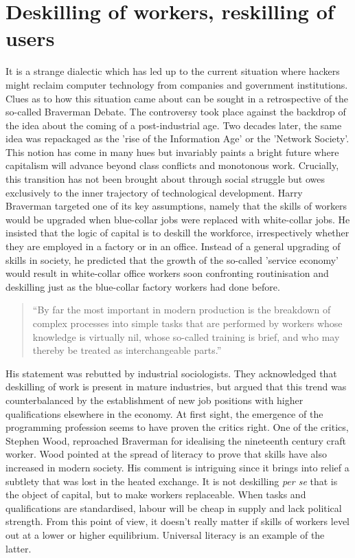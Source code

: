 \section{Deskilling of workers, reskilling of users}
\label{s:hackers_gnunited-deskilling}

It is a strange dialectic which has led up to the current situation where
hackers might reclaim computer technology from companies and government
institutions. Clues as to how this situation came about can be sought in a
retrospective of the so-called Braverman Debate. The controversy took place
against the backdrop of the idea about the coming of a post-industrial
age\cite{gnunited-bell73}. Two decades later, the same idea was repackaged as
the 'rise of the Information Age' or the 'Network Society'. This notion has come
in many hues but invariably paints a bright future where capitalism will advance
beyond class conf\hbox{}licts and monotonous work. Crucially, this transition has not
been brought about through social struggle but owes exclusively to the inner
trajectory of technological development. Harry Braverman targeted one of its key
assumptions, namely that the skills of workers would be upgraded when
blue-collar jobs were replaced with white-collar jobs. He insisted that the
logic of capital is to deskill the workforce, irrespectively whether they are
employed in a factory or in an of\hbox{}f\hbox{}ice. Instead of a general upgrading of
skills in society, he predicted that the growth of the so-called 'service
economy' would result in white-collar of\hbox{}f\hbox{}ice workers soon confronting
routinisation and deskilling just as the blue-collar factory workers had done
before.

\begin{quote}
``By far the most important in modern production is the breakdown of complex
processes into simple tasks that are performed by workers whose knowledge is
virtually nil, whose so-called training is brief, and who may thereby be treated
as interchangeable parts.''\cite{gnunited-braverman98-318}
\end{quote}

His statement was rebutted by industrial sociologists. They acknowledged that
deskilling of work is present in mature industries, but argued that this trend
was counterbalanced by the establishment of new job positions with higher
qualif\hbox{}ications elsewhere in the economy. At first sight, the emergence of the
programming profession seems to have proven the critics right. One of the
critics, Stephen Wood, reproached Braverman for idealising the nineteenth
century craft worker. Wood pointed at the spread of literacy to prove that
skills have also increased in modern society\cite{gnunited-wood82}. His comment
is intriguing since it brings into relief a subtlety that was lost in the heated
exchange. It is not deskilling \textit{per se} that is the object of capital,
but to make workers replaceable. When tasks and qualif\hbox{}ications are
standardised, labour will be cheap in supply and lack political strength. From
this point of view, it doesn't really matter if skills of workers level out at a
lower or higher equilibrium.  Universal literacy is an example of the latter. 

